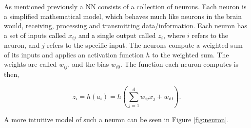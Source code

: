 As mentioned previously a \gls{NN} consists of a collection of neurons. Each
neuron is a simplified mathematical model, which behaves much like neurons
in the brain would, receiving, processing and transmitting data/information.
Each neuron has a set of inputs called $x_{ij}$ and a single output called
$z_i$, where $i$ refers to the neuron, and $j$ refers to the specific input. The
neurons compute a weighted sum of its inputs and applies an activation function
$h$ to the weighted sum. The weights are called $w_{ij}$, and the bias $w_{i0}$.
The function each neuron computes is then,

\begin{equation}\label{eq:neuron}
    z_i = h(a_i) = h\left(
        \sum_{j = 1}^d w_{ij}x_j + w_{i0}
    \right).
\end{equation}

A more intuitive model of such a neuron can be seen in Figure \ref{fig:neuron}.

